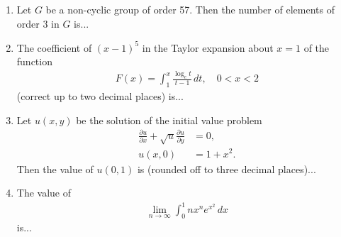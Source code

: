 \documentclass[journal]{IEEEtran}
\numberwithin{equation}{enumi}
\numberwithin{figure}{enumi}
\begin{document}
\begin{enumerate}[start=53]
\item Let \(G\) be a non-cyclic group of order 57. Then the number of elements of order 3 in \(G\) is...

\item The coefficient of \((x-1)^5\) in the Taylor expansion about \(x = 1\) of the function
\begin{align*}
    F(x) = \int_1^x \frac{\log_e t}{t-1} \, dt, \quad 0 < x < 2 
\end{align*}
(correct up to two decimal places) is...

\item Let \(u(x, y)\) be the solution of the initial value problem 
\begin{align*}
\frac{\partial u}{\partial x} + \sqrt{u} \frac{\partial u}{\partial y} &= 0, \\
u(x, 0) &= 1 + x^2.
\end{align*}
Then the value of \(u(0, 1)\) is (rounded off to three decimal places)...

\item The value of 
\begin{align*}
\lim_{n \to \infty} \int_0^1 nx^n e^{x^2} \, dx
\end{align*}
is...
\end{enumerate}
\end{document}
